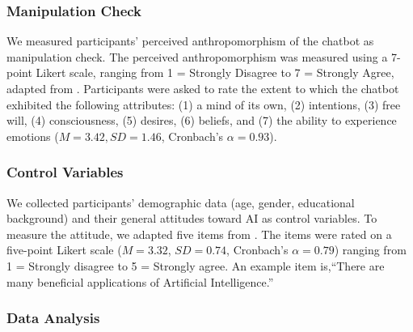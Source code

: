\subsubsection{Manipulation Check}

We measured participants' perceived anthropomorphism of the chatbot as manipulation check. The perceived anthropomorphism was measured using a 7-point Likert scale, ranging from 1 = Strongly Disagree to 7 = Strongly Agree, adapted from \cite{seeger2018designing}. Participants were asked to rate the extent to which the chatbot exhibited the following attributes: (1) a mind of its own, (2) intentions, (3) free will, (4) consciousness, (5) desires, (6) beliefs, and (7) the ability to experience emotions ($M=3.42, SD=1.46$, Cronbach's \(\alpha=0.93\)).

\subsubsection{Control Variables}
We collected participants' demographic data (age, gender, educational background) and their general attitudes toward AI as control variables. To measure the attitude, we adapted five items from \cite{SCHEPMAN2020100014}. The items were rated on a five-point Likert scale ($M=3.32$, $SD=0.74$, Cronbach's $\alpha=0.79$) ranging from 1 = Strongly disagree to 5 = Strongly agree. An example item is,``There are many beneficial applications of Artificial Intelligence.''

\subsubsection{Data Analysis}

